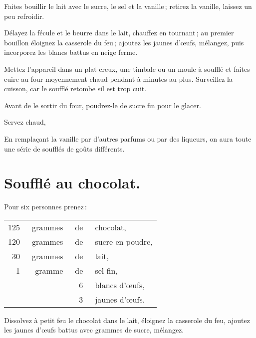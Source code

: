 Faites bouillir le lait avec le sucre, le sel et la vanille ; retirez la
vanille, laissez un peu refroidir.

Délayez la fécule et le beurre dans le lait, chauffez en tournant ; au premier
bouillon éloignez la casserole du feu ; ajoutez les jaunes d'œufs, mélangez, puis
incorporez les blancs battus en neige ferme.

Mettez l'appareil dans un plat creux, une timbale ou un moule à soufflé et
faites cuire au four moyennement chaud pendant {\mmm} à {\mmm}
minutes au plus. Surveillez la cuisson, car le soufflé retombe sil est trop
cuit.

Avant de le sortir du four, poudrez-le de sucre fin pour le glacer.

Servez chaud,

\sk

En remplaçant la vanille par d'autres parfums ou par des liqueurs, on aura
toute une série de soufflés de goûts différents.

\section*{\centering Soufflé au chocolat.}
{}

Pour six personnes prenez :

\footnotesize
\begin{longtable}{rrrp{16em}}
    125 & grammes & de & chocolat,                                                                        \\
    120 & grammes & de & sucre en poudre,                                                                 \\
     30 & grammes & de & lait,                                                                            \\
      1 & gramme  & de & sel fin,                                                                         \\
        &         &  6 & blancs d'œufs,                                                                   \\
        &         &  3 & jaunes d'œufs.                                                                   \\
\end{longtable}
\normalsize

Dissolvez à petit feu le chocolat dans le lait, éloignez la casserole du feu,
ajoutez les jaunes d'œufs battus avec {\mmm} grammes de sucre, mélangez.

